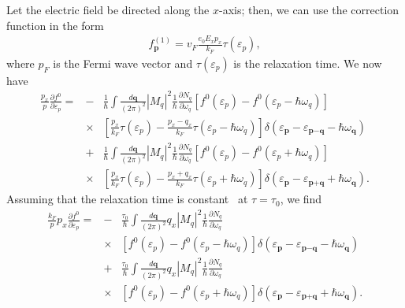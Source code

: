 %
Let the electric field be directed along the $x$-axis; then, we can use the correction function in the form
\begin{eqnarray}
f^{(1)}_\textbf{p}= v_F\frac{e_0E_xp_x}{k_F}\tau(\varepsilon_p),
\end{eqnarray}
%
where $p_F$ is the Fermi wave vector and $\tau(\varepsilon_p)$ is the relaxation time.  
We now have
%
\begin{eqnarray}\label{AP6_A5}
\frac{p_x}{p}\frac{\partial f^0}{\partial \varepsilon_p}
=&-&\frac{1}{\hbar}\int\frac{d\textbf{q}}{(2\pi)^2}|M_q|^2\frac{1}{\hbar}\frac{\partial N_q}{\partial \omega_q}
\left[f^0(\varepsilon_p)-f^0(\varepsilon_{p}-\hbar\omega_q)\right] \nonumber \\ 
&\times&\left[\frac{p_x}{k_F}\tau(\varepsilon_p)-\frac{p_x-q_x}{k_F}\tau(\varepsilon_p-\hbar\omega_q)\right]
\delta(\varepsilon_{\textbf{p}}-\varepsilon_{\textbf{p}-\textbf{q}}-\hbar\omega_\textbf{q})\nonumber\\
&+&\frac{1}{\hbar}\int\frac{d\textbf{q}}{(2\pi)^2}|M_q|^2\frac{1}{\hbar}\frac{\partial N_q}{\partial \omega_q}
\left[f^0(\varepsilon_p)-f^0(\varepsilon_{p}+\hbar\omega_q)\right] \nonumber \\ 
&\times&\left[\frac{p_x}{k_F}\tau(\varepsilon_p)-\frac{p_x+q_x}{k_F}\tau(\varepsilon_p+\hbar\omega_q)\right]
\delta(\varepsilon_{\textbf{p}}-\varepsilon_{\textbf{p}+\textbf{q}}+\hbar\omega_\textbf{q}).
\end{eqnarray}
%
Assuming that the relaxation time is constant~\cite{Ziman:2001aa} at $\tau=\tau_0$, we find
%
\begin{eqnarray}
\label{AP6_ABoltzmann1}
\frac{k_F}{p}p_x\frac{\partial f^0}{\partial \varepsilon_p}
=&-&\frac{\tau_0}{\hbar}\int \frac{d\textbf{q}}{(2\pi)^2}q_x|M_q|^2\frac{1}{\hbar}\frac{\partial N_q}{\partial \omega_q}\\ \nonumber
&\times&\left[f^0(\varepsilon_p)-f^0(\varepsilon_{p}-\hbar\omega_q)\right]
\delta(\varepsilon_{\textbf{p}}-\varepsilon_{\textbf{p}-\textbf{q}}-\hbar\omega_\textbf{q})\\
\nonumber
&+&\frac{\tau_0}{\hbar}\int \frac{d\textbf{q}}{(2\pi)^2}q_x|M_q|^2\frac{1}{\hbar}\frac{\partial N_q}{\partial \omega_q}\\ \nonumber
&\times&\left[f^0(\varepsilon_p)-f^0(\varepsilon_{p}+\hbar\omega_q)\right]
\delta(\varepsilon_{\textbf{p}}-\varepsilon_{\textbf{p}+\textbf{q}}+\hbar\omega_\textbf{q}).
\end{eqnarray}
%

